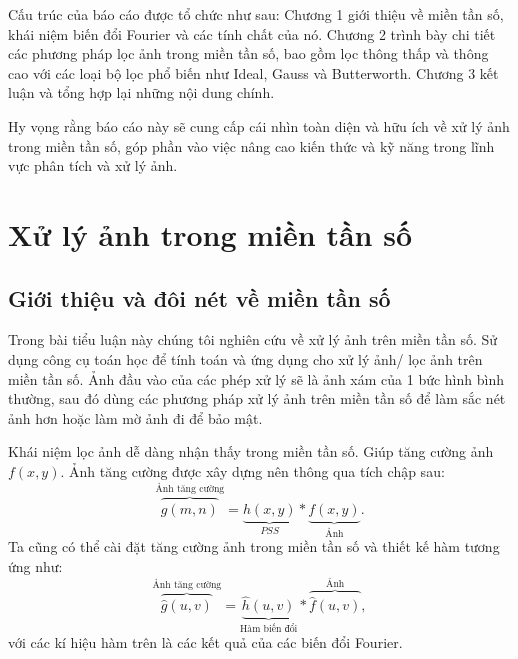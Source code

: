 \documentclass[12pt,a4paper]{report}
\numberwithin{equation}{section}
\theoremstyle{definition} %
\begin{document}
	Cấu trúc của báo cáo được tổ chức như sau: Chương 1 giới thiệu về miền tần số, khái niệm biến đổi Fourier và các tính chất của nó. Chương 2 trình bày chi tiết các phương pháp lọc ảnh trong miền tần số, bao gồm lọc thông thấp và thông cao với các loại bộ lọc phổ biến như Ideal, Gauss và Butterworth. Chương 3 kết luận và tổng hợp lại những nội dung chính.

	Hy vọng rằng báo cáo này sẽ cung cấp cái nhìn toàn diện và hữu ích về xử lý ảnh trong miền tần số, góp phần vào việc nâng cao kiến thức và kỹ năng trong lĩnh vực phân tích và xử lý ảnh.

	\vspace{3cm}




	
	
	\newpage
	\renewcommand{\baselinestretch}{1.2}
	

\chapter{\centering Xử lý ảnh trong miền tần số}

\section{Giới thiệu và đôi nét về miền tần số}
Trong bài tiểu luận này chúng tôi nghiên cứu về xử lý ảnh trên miền tần số. Sử dụng công cụ toán học để tính toán và ứng dụng cho xử lý ảnh/ lọc ảnh trên miền tần số. Ảnh đầu vào của các phép xử lý sẽ là ảnh xám của 1 bức hình bình thường, sau đó dùng các phương pháp xử lý ảnh trên miền tần số để làm sắc nét ảnh hơn hoặc làm mờ ảnh đi để 
bảo mật. 

Khái niệm lọc ảnh dễ dàng nhận thấy trong miền tần số. Giúp tăng cường ảnh $f(x,y)$. Ảnh tăng cường được xây dựng nên thông qua tích chập sau: 
\[\overbrace{g(m,n)}^{\text{Ảnh tăng cường}} = \underbrace{h(x,y)}_{PSS}\ast\underbrace{f(x,y)}_{\text{Ảnh}}.\]
Ta cũng có thể cài đặt tăng cường ảnh trong miền tần số và thiết kế hàm tương ứng như: 
\[\overbrace{\hat{g}(u,v)}^{\text{Ảnh tăng cường}} = \underbrace{\hat{h}(u,v)}_{\text{Hàm biến đổi}} \ast \overbrace{\hat{f}(u,v)}^{\text{Ảnh}},\]
với các kí hiệu hàm trên là các kết quả của các biến đổi Fourier.
\end{document}
